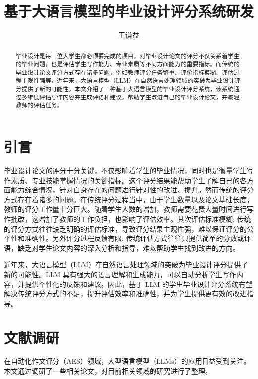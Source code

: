 \documentclass{article}
\title{基于大语言模型的毕业设计评分系统研发}
\author{王谦益}
\date{}
\begin{document}
\maketitle

\begin{abstract}

毕业设计是每一位大学生都必须要完成的项目，对毕业设计论文的评分不仅关系着学生的毕业问题，也是评估学生写作能力、专业素质等不同方面能力的重要指标。而传统的毕业设计论文评分方式存在诸多问题，例如教师评分任务繁重、评价指标模糊、评估过程主观性强等。近年来，大语言模型（LLM）在自然语言处理领域的突破为毕业设计评分提供了新的可能性。本文介绍了一种基于大语言模型的毕业设计评分系统，该系统通过多维度评估写作内容并生成评语和建议，帮助学生改进自己的毕业设计论文，并减轻教师的评估任务。


\end{abstract}

\section{引言}

毕业设计论文的评分十分关键，不仅影响着学生的毕业情况，同时也是衡量学生写作素质、专业技能掌握情况的关键指标。这个评分结果能帮助学生了解自己的各方面能力综合情况，针对自身存在的问题进行针对性的改进、提升。然而传统的评分方式存在着诸多的问题。在传统评分过程当中，由于学生数量以及论文基础长度，教师的评分工作量十分巨大。随着学生人数的增加，教师需要花费大量时间进行写作批改，这增加了教师的工作负担，也影响了评估效率。\cite{ref1}其次评估标准模糊: 传统的评分方式往往缺乏明确的评估标准，导致评分结果主观性强，难以保证评分的公平性和准确性。\cite{ref2}另外评分过程反馈有限: 传统评估方式往往只提供简单的分数或评语，缺乏对学生论文内容的深入分析和指导，难以帮助学生找到改进的方向。

近年来，大语言模型（LLM）在自然语言处理领域的突破为毕业设计评分提供了新的可能性。\cite{ref2}LLM 具有强大的语言理解和生成能力，可以自动分析学生写作内容，并提供个性化的反馈和建议。因此，基于 LLM 的学生毕业设计评分系统有望解决传统评分方式的不足，提升评估效率和准确性，并为学生提供更有效的改进指导。\cite{ref3, ref4}

\section{文献调研}

在自动化作文评分（AES）领域，大型语言模型（LLMs）的应用日益受到关注。本文通过调研了一些相关论文，对目前相关领域的研究进行了整理。
\end{document}
